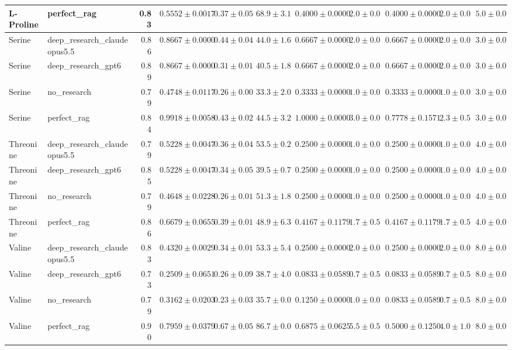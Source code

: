 \begin{table}[htbp]
\begin{tabular}{llrrrrrrrrr}
L-Proline & perfect_rag & 0.83 & \cellcolor{green!25}$0.5552 \pm 0.0017$ & $0.37 \pm 0.05$ & $68.9 \pm 3.1$ & $0.4000 \pm 0.0000$ & $2.0 \pm 0.0$ & $0.4000 \pm 0.0000$ & $2.0 \pm 0.0$ & $5.0 \pm 0.0$ \\
\midrule
Serine & deep_research_claudeopus5.5 & 0.86 & $0.8667 \pm 0.0000$ & $0.44 \pm 0.04$ & $44.0 \pm 1.6$ & $0.6667 \pm 0.0000$ & $2.0 \pm 0.0$ & $0.6667 \pm 0.0000$ & $2.0 \pm 0.0$ & $3.0 \pm 0.0$ \\
Serine & deep_research_gpt6 & 0.89 & $0.8667 \pm 0.0000$ & $0.31 \pm 0.01$ & $40.5 \pm 1.8$ & $0.6667 \pm 0.0000$ & $2.0 \pm 0.0$ & $0.6667 \pm 0.0000$ & $2.0 \pm 0.0$ & $3.0 \pm 0.0$ \\
Serine & no_research & 0.79 & \cellcolor{red!25}$0.4748 \pm 0.0117$ & $0.26 \pm 0.00$ & $33.3 \pm 2.0$ & $0.3333 \pm 0.0000$ & $1.0 \pm 0.0$ & $0.3333 \pm 0.0000$ & $1.0 \pm 0.0$ & $3.0 \pm 0.0$ \\
Serine & perfect_rag & 0.84 & \cellcolor{green!25}$0.9918 \pm 0.0058$ & $0.43 \pm 0.02$ & $44.5 \pm 3.2$ & $1.0000 \pm 0.0000$ & $3.0 \pm 0.0$ & $0.7778 \pm 0.1571$ & $2.3 \pm 0.5$ & $3.0 \pm 0.0$ \\
\midrule
Threonine & deep_research_claudeopus5.5 & 0.79 & $0.5228 \pm 0.0047$ & $0.36 \pm 0.04$ & $53.5 \pm 0.2$ & $0.2500 \pm 0.0000$ & $1.0 \pm 0.0$ & $0.2500 \pm 0.0000$ & $1.0 \pm 0.0$ & $4.0 \pm 0.0$ \\
Threonine & deep_research_gpt6 & 0.85 & $0.5228 \pm 0.0047$ & $0.34 \pm 0.05$ & $39.5 \pm 0.7$ & $0.2500 \pm 0.0000$ & $1.0 \pm 0.0$ & $0.2500 \pm 0.0000$ & $1.0 \pm 0.0$ & $4.0 \pm 0.0$ \\
Threonine & no_research & 0.79 & \cellcolor{red!25}$0.4648 \pm 0.0228$ & $0.26 \pm 0.01$ & $51.3 \pm 1.8$ & $0.2500 \pm 0.0000$ & $1.0 \pm 0.0$ & $0.2500 \pm 0.0000$ & $1.0 \pm 0.0$ & $4.0 \pm 0.0$ \\
Threonine & perfect_rag & 0.86 & \cellcolor{green!25}$0.6679 \pm 0.0655$ & $0.39 \pm 0.01$ & $48.9 \pm 6.3$ & $0.4167 \pm 0.1179$ & $1.7 \pm 0.5$ & $0.4167 \pm 0.1179$ & $1.7 \pm 0.5$ & $4.0 \pm 0.0$ \\
\midrule
Valine & deep_research_claudeopus5.5 & 0.83 & $0.4320 \pm 0.0029$ & $0.34 \pm 0.01$ & $53.3 \pm 5.4$ & $0.2500 \pm 0.0000$ & $2.0 \pm 0.0$ & $0.2500 \pm 0.0000$ & $2.0 \pm 0.0$ & $8.0 \pm 0.0$ \\
Valine & deep_research_gpt6 & 0.73 & \cellcolor{red!25}$0.2509 \pm 0.0651$ & $0.26 \pm 0.09$ & $38.7 \pm 4.0$ & $0.0833 \pm 0.0589$ & $0.7 \pm 0.5$ & $0.0833 \pm 0.0589$ & $0.7 \pm 0.5$ & $8.0 \pm 0.0$ \\
Valine & no_research & 0.79 & $0.3162 \pm 0.0203$ & $0.23 \pm 0.03$ & $35.7 \pm 0.0$ & $0.1250 \pm 0.0000$ & $1.0 \pm 0.0$ & $0.0833 \pm 0.0589$ & $0.7 \pm 0.5$ & $8.0 \pm 0.0$ \\
Valine & perfect_rag & 0.90 & \cellcolor{green!25}$0.7959 \pm 0.0379$ & $0.67 \pm 0.05$ & $86.7 \pm 0.0$ & $0.6875 \pm 0.0625$ & $5.5 \pm 0.5$ & $0.5000 \pm 0.1250$ & $4.0 \pm 1.0$ & $8.0 \pm 0.0$ \\
\bottomrule
\end{tabular}
\end{table}